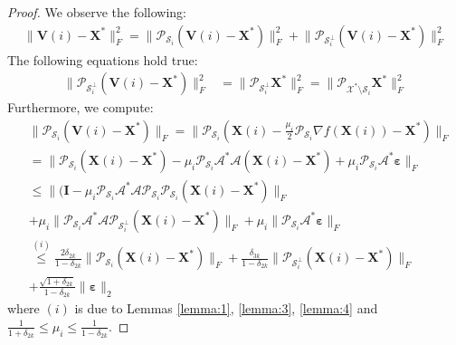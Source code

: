 \documentclass[twocolumn]{svjour3}
\newcommand{\vectornormbig}[1]{\big\|#1\big\|}
\newcommand{\sensing}{\boldsymbol{\mathcal{A}}}
\newcommand{\signal}{\boldsymbol{X}}
\newcommand{\bestsignal}{\boldsymbol{X}^\ast}
\newcommand{\noise}{\boldsymbol{\varepsilon}}
\newcommand{\id}{\mathbf{I}}
\newcommand{\rank}{k}
\begin{document}
\begin{proof} We observe the following:
\begin{align}
\vectornormbig{\boldsymbol{V}(i) - \bestsignal}_F^2 = \vectornormbig{\mathcal{P}_{\mathcal{S}_i}(\boldsymbol{V}(i) - \bestsignal)}_F^2 + \vectornormbig{\mathcal{P}_{\mathcal{S}_i^\bot}(\boldsymbol{V}(i) - \bestsignal)}_F^2 \label{eq:appr_greedy:00}
\end{align}
The following equations hold true:
\begin{align}
\vectornormbig{\mathcal{P}_{\mathcal{S}_i^\bot}(\boldsymbol{V}(i) - \bestsignal)}_F^2 &= \vectornormbig{\mathcal{P}_{\mathcal{S}_i^\bot} \bestsignal}_F^2 = \vectornormbig{\mathcal{P}_{\mathcal{X}^\ast \setminus \mathcal{S}_i} \bestsignal}_F^2 \nonumber 
\end{align} Furthermore, we compute:
\begin{align}
&\vectornormbig{\mathcal{P}_{\mathcal{S}_i}(\boldsymbol{V}(i) - \bestsignal)}_F = \vectornormbig{\mathcal{P}_{\mathcal{S}_i}(\signal(i) - \frac{\mu_i}{2}\mathcal{P}_{\mathcal{S}_i}\nabla f(\signal(i)) - \bestsignal)}_F \nonumber \\
&= \vectornormbig{\mathcal{P}_{\mathcal{S}_i}(\signal(i) - \bestsignal) - \mu_i \mathcal{P}_{\mathcal{S}_i}\sensing^\ast \sensing (\signal(i) - \bestsignal) + \mu_i \mathcal{P}_{\mathcal{S}_i}\sensing^\ast \noise }_F \nonumber \\
&\leq \vectornormbig{(\id - \mu_i \mathcal{P}_{\mathcal{S}_i}\sensing^\ast \sensing \mathcal{P}_{\mathcal{S}_i} \mathcal{P}_{\mathcal{S}_i}(\signal(i) - \bestsignal)}_F \nonumber \\ &+ \mu_i \vectornormbig{\mathcal{P}_{\mathcal{S}_i}\sensing^\ast \sensing \mathcal{P}_{\mathcal{S}_i^\bot}(\signal(i) - \bestsignal)}_F + \mu_i \vectornormbig{\mathcal{P}_{\mathcal{S}_i}\sensing^\ast \noise}_F \nonumber \\
&\stackrel{(i)}{\leq} \frac{2\delta_{2\rank}}{1-\delta_{2\rank}}\vectornormbig{\mathcal{P}_{\mathcal{S}_i}(\signal(i) - \bestsignal)}_F + \frac{\delta_{3\rank}}{1-\delta_{2\rank}} \vectornormbig{\mathcal{P}_{\mathcal{S}_i^\bot}(\signal(i) - \bestsignal)}_F \nonumber \\ &+ \frac{\sqrt{1+\delta_{2\rank}}}{1-\delta_{2\rank}}\vectornormbig{\noise}_2 \label{eq:appr_greedy:02}
\end{align} where $ (i) $ is due to Lemmas \ref{lemma:1}, \ref{lemma:3}, \ref{lemma:4} and $ \frac{1}{1+\delta_{2\rank}} \leq \mu_i \leq \frac{1}{1-\delta_{2\rank}} $.


\end{proof}
\end{document}
